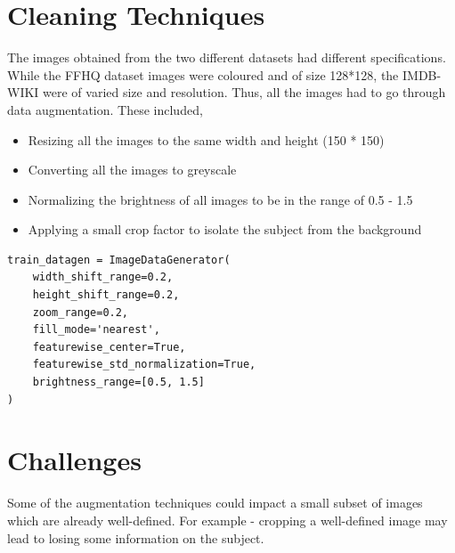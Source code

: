 \section{Cleaning Techniques}
\noindent The images obtained from the two different datasets had different specifications. While the FFHQ \cite{FFHQ} dataset images were coloured and of size 128*128, the IMDB-WIKI \cite{IMDBWiki} were of varied size and resolution. Thus, all the images had to go through data augmentation. These included,
\begin{itemize}
    \item  Resizing all the images to the same width and height (150 * 150)
    \item Converting all the images to greyscale
    \item Normalizing the brightness of all images to be in the range of 0.5 - 1.5 
    \item Applying a small crop factor to isolate the subject from the background
\end{itemize}

\lstset{
  language=Python,
  basicstyle=\ttfamily,
  numbers=left,
  frame=single,
  captionpos=b,
}

\begin{lstlisting}[caption={Augmenting the dataset using Keras \cite{Keras}}]
train_datagen = ImageDataGenerator(
    width_shift_range=0.2,
    height_shift_range=0.2,
    zoom_range=0.2,        
    fill_mode='nearest',
    featurewise_center=True,
    featurewise_std_normalization=True,
    brightness_range=[0.5, 1.5] 
)
\end{lstlisting}

\hspace*{1em}
\section{Challenges}
\noindent Some of the augmentation techniques could impact a small subset of images which are already well-defined. For example - cropping a well-defined image may lead to losing some information on the subject.\\

\pagebreak

